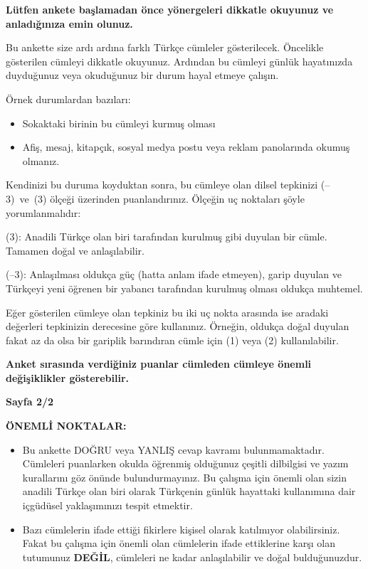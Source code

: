 \textbf{Lütfen ankete başlamadan önce yönergeleri dikkatle okuyunuz ve anladığınıza emin olunuz.}

Bu ankette size ardı ardına farklı Türkçe cümleler gösterilecek. Öncelikle gösterilen cümleyi dikkatle okuyunuz. Ardından bu cümleyi günlük hayatınızda duyduğunuz veya okuduğunuz bir durum hayal etmeye çalışın.

Örnek durumlardan bazıları: 

\begin{itemize}
	\item Sokaktaki birinin bu cümleyi kurmuş olması
	\item Afiş, mesaj, kitapçık, sosyal medya postu veya reklam panolarında okumuş olmanız.
\end{itemize}


\begin{sloppypar}
	
	Kendinizi bu duruma koyduktan sonra, bu cümleye olan dilsel tepkinizi \mbox{(--3) ve (3)} ölçeği üzerinden puanlandırınız. Ölçeğin uç noktaları şöyle yorumlanmalıdır: 
	
\end{sloppypar}

(3): Anadili Türkçe olan biri tarafından kurulmuş gibi duyulan bir cümle. Tamamen doğal ve anlaşılabilir. 



(--3): Anlaşılması oldukça güç (hatta anlam ifade etmeyen), garip duyulan ve Türkçeyi yeni öğrenen bir yabancı tarafından kurulmuş olması oldukça muhtemel.


Eğer gösterilen cümleye olan tepkiniz bu iki uç nokta arasında ise aradaki değerleri tepkinizin derecesine göre kullanınız. Örneğin, oldukça doğal duyulan fakat az da olsa bir gariplik barındıran cümle için (1) veya (2) kullanılabilir. 

\vspace{10pt}
\textbf{
	Anket sırasında verdiğiniz puanlar cümleden cümleye önemli değişiklikler gösterebilir.}

\newpage
\begin{center}
	\large \textbf{Sayfa 2/2}
\end{center}

\textbf{ÖNEMLİ NOKTALAR:}

\begin{itemize}
	\item Bu ankette DOĞRU veya YANLIŞ cevap kavramı bulunmamaktadır. Cümleleri puanlarken okulda öğrenmiş olduğunuz çeşitli dilbilgisi ve yazım kurallarını göz önünde bulundurmayınız. Bu çalışma için önemli olan sizin anadili Türkçe olan biri olarak Türkçenin günlük hayattaki kullanımına dair içgüdüsel yaklaşımınızı tespit etmektir.
	\item Bazı cümlelerin ifade ettiği fikirlere kişisel olarak katılmıyor olabilirsiniz. Fakat bu çalışma için önemli olan cümlelerin ifade ettiklerine karşı olan tutumunuz \textbf{DEĞİL}, cümleleri ne kadar anlaşılabilir ve doğal bulduğunuzdur.
\end{itemize}

